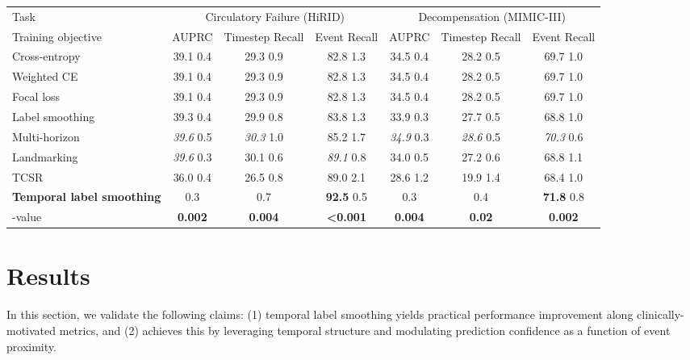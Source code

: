 \documentclass[nohyperref]{article}
\begin{document}
\begin{table*}[t]
{\begin{tabular}{lcccccc}
 Task & \multicolumn{3}{c}{Circulatory Failure (HiRID)} & \multicolumn{3}{c}{Decompensation (MIMIC-III)} \\
 \cmidrule(lr){2-4} \cmidrule(lr){5-7}
Training objective &         AUPRC & Timestep  Recall & Event Recall &        AUPRC &  Timestep Recall &Event Recall \\
\midrule
Cross-entropy   \citep{Lauritsen2020, hyland2020}     &             39.1  0.4 &             29.3  0.9 &   82.8  1.3 &        34.5  0.4 &             28.2  0.5 & 69.7  1.0\\
Weighted CE  \cite{king2001logistic} &             39.1  0.4 &             29.3  0.9 &  82.8  1.3  &         34.5  0.4 &             28.2  0.5 & 69.7  1.0 \\
Focal loss  \cite{lin2017,wang2020feature, roy2022disability} &             39.1  0.4 &             29.3  0.9 & 82.8  1.3 &            34.5  0.4 &             28.2  0.5 & 69.7  1.0\\
Label smoothing \citep{DBLP:conf/cvpr/SzegedyVISW16}      &             39.3  0.4 &             29.9  0.8 &     83.8  1.3 &       33.9  0.3 &             27.7  0.5 & 68.8  1.0 \\
Multi-horizon \citep{tomavsev2019,jarrett2019dynamic} &             {\it 39.6}  0.5 &             {\it 30.3}  1.0 & 85.2  1.7      &      {\it 34.9}  0.3 &             {\it 28.6}  0.5 & {\it 70.3}  0.6 \\\midrule
 Landmarking \cite{van2007dynamic,parast2014landmark} &             {\it 39.6}  0.3 &           30.1  0.6 & {\it 89.1}  0.8&   34.0  0.5 &           27.2  0.6 &  68.8  1.1 \\
 TCSR \cite{Maystre2022} &         36.0   0.4  &	26.5   0.8  &  89.0  2.1&  28.6  1.2 &           19.9  1.4 & 68.4  1.0\\
\midrule
\textbf{Temporal label smoothing}     &    0.3 &    0.7 & \textbf{92.5}  0.5 &  0.3 &    0.4 & \textbf{71.8}  0.8\\
\midrule
{-value}  & \textbf{0.002} & \textbf{0.004}  &  \textbf{<0.001} & \textbf{0.004} & {\textbf{0.02}}  &  \textbf{0.002}\\
\bottomrule
\end{tabular}}
\end{table*}

\section{Results}\label{sec:results}

In this section, we validate the following claims: (1) temporal label smoothing yields practical performance improvement along clinically-motivated metrics, and (2) achieves this by leveraging temporal structure and modulating prediction confidence as a function of event proximity.
\end{document}
